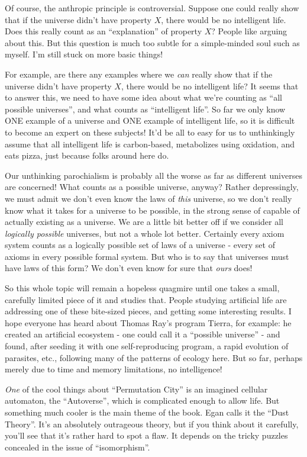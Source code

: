 \documentclass{article}
\begin{document}
Of course, the anthropic principle is controversial. Suppose one could
really show that if the universe didn't have property \(X\), there would
be no intelligent life. Does this really count as an ``explanation'' of
property \(X\)? People like arguing about this. But this question is
much too subtle for a simple-minded soul such as myself. I'm still stuck
on more basic things!

For example, are there any examples where we \emph{can} really show that
if the universe didn't have property \(X\), there would be no
intelligent life? It seems that to answer this, we need to have some
idea about what we're counting as ``all possible universes'', and what
counts as ``intelligent life''. So far we only know ONE example of a
universe and ONE example of intelligent life, so it is difficult to
become an expert on these subjects! It'd be all to easy for us to
unthinkingly assume that all intelligent life is carbon-based,
metabolizes using oxidation, and eats pizza, just because folks around
here do.

Our unthinking parochialism is probably all the worse as far as
different universes are concerned! What counts as a possible universe,
anyway? Rather depressingly, we must admit we don't even know the laws
of \emph{this} universe, so we don't really know what it takes for a
universe to be possible, in the strong sense of capable of actually
existing as a universe. We are a little bit better off if we consider
all \emph{logically possible} universes, but not a whole lot better.
Certainly every axiom system counts as a logically possible set of laws
of a universe - every set of axioms in every possible formal system. But
who is to say that universes must have laws of this form? We don't even
know for sure that \emph{ours} does!

So this whole topic will remain a hopeless quagmire until one takes a
small, carefully limited piece of it and studies that. People studying
artificial life are addressing one of these bite-sized pieces, and
getting some interesting results. I hope everyone has heard about Thomas
Ray's program Tierra, for example: he created an artificial ecosystem -
one could call it a ``possible universe'' - and found, after seeding it
with one self-reproducing program, a rapid evolution of parasites, etc.,
following many of the patterns of ecology here. But so far, perhaps
merely due to time and memory limitations, no intelligence!

\emph{One} of the cool things about ``Permutation City'' is an imagined
cellular automaton, the ``Autoverse'', which is complicated enough to
allow life. But something much cooler is the main theme of the book.
Egan calls it the ``Dust Theory''. It's an absolutely outrageous theory,
but if you think about it carefully, you'll see that it's rather hard to
spot a flaw. It depends on the tricky puzzles concealed in the issue of
``isomorphism''.
\end{document}
